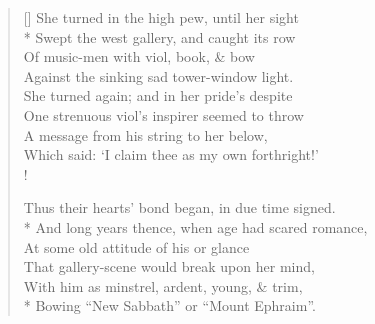 \documentclass[MAIN]{subfiles}
\begin{document}
\settowidth{\versewidth}{\vin One strenuous viol's inspirer seemed to throw}
\begin{verse}[\versewidth]
She turned in the high pew, until her sight\\* 
\vin Swept the west gallery, and caught its row\\
\vin Of music-men with viol, book, \& bow\\
Against the sinking sad tower-window light.\\
She turned again; and in her pride's despite\\
\vin One strenuous viol's inspirer seemed to throw\\
\vin A message from his string to her below,\\
Which said: `I claim thee as my own forthright!'\\!

Thus their hearts' bond began, in due time signed.\\*
\vin And long years thence, when age had scared romance,\\
\vin At some old attitude of his or glance\\
That gallery-scene would break upon her mind,\\
\vin With him as minstrel, ardent, young, \& trim,\\*
\vin Bowing ``New Sabbath'' or ``Mount Ephraim''.
\end{verse}
\end{document}

